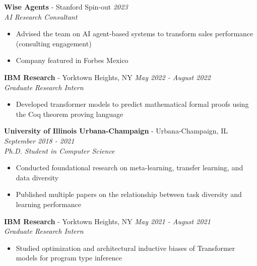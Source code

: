 \documentclass{article}
\newenvironment{changemargin}[2]{%
  \begin{list}{}{%
    \setlength{\topsep}{0pt}%
    \setlength{\leftmargin}{#1}%
    \setlength{\rightmargin}{#2}%
    \setlength{\listparindent}{\parindent}%
    \setlength{\itemindent}{\parindent}%
    \setlength{\parsep}{\parskip}%
  }%
  \item[]}{\end{list}
}
\newenvironment{body} {
	\vspace*{-16pt}
	\begin{changemargin}{-0.25in}{-0.5in}
  }	
	{\end{changemargin}
}
\begin{document}
\begin{body}
	\textbf{Wise Agents} - Stanford Spin-out \hfill \emph{2023}\\
	\emph{AI Research Consultant}\\
	\vspace*{-3pt}
	\begin{itemize} \itemsep -2pt
		\item Advised the team on AI agent-based systems to transform sales performance (consulting engagement)
		\item Company featured in Forbes Mexico
	\end{itemize}
	\vspace{5 pt}

	\textbf{IBM Research} - Yorktown Heights, NY \hfill \emph{May 2022 - August 2022}\\
	\emph{Graduate Research Intern}\\
	\vspace*{-3pt}
	\begin{itemize} \itemsep -2pt
		\item Developed transformer models to predict mathematical formal proofs using the Coq theorem proving language
	\end{itemize}
	\vspace{5 pt}

	\textbf{University of Illinois Urbana-Champaign} - Urbana-Champaign, IL \hfill \emph{September 2018 - 2021}\\
	\emph{Ph.D. Student in Computer Science}\\
	\vspace*{-3pt}
	\begin{itemize} \itemsep -2pt
		\item Conducted foundational research on meta-learning, transfer learning, and data diversity
		\item Published multiple papers on the relationship between task diversity and learning performance
	\end{itemize}
	\vspace{5 pt}
	
	\textbf{IBM Research} - Yorktown Heights, NY \hfill \emph{May 2021 - August 2021}\\
	\emph{Graduate Research Intern}\\
	\vspace*{-3pt}
	\begin{itemize} \itemsep -2pt
		\item Studied optimization and architectural inductive biases of Transformer models for program type inference
	\end{itemize}
	\vspace{5 pt}


\end{body}
\end{document}
